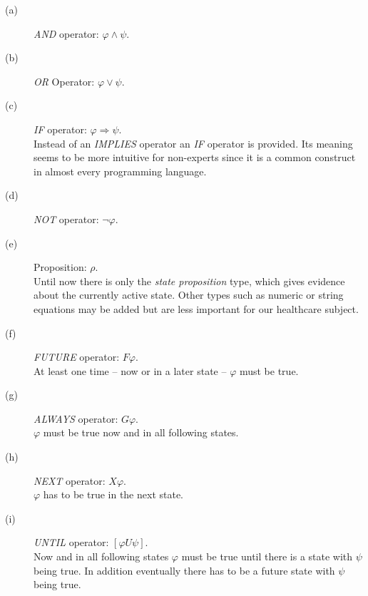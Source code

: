 \documentclass[conference]{IEEEtran}
\begin{document}
\begin{description}
	\item[(a)] \emph{AND} operator: $\varphi \wedge \psi$.
	\item[(b)] \emph{OR} Operator: $\varphi \vee \psi$.
	\item[(c)] \emph{IF} operator: $\varphi \Rightarrow \psi$.\\Instead of an \emph{IMPLIES} operator an \emph{IF} operator is provided. Its meaning seems to be more intuitive for non-experts since it is a common construct in almost every programming language.
	\item[(d)] \emph{NOT} operator: $\neg \varphi$.
	\item[(e)] Proposition: $\rho$.\\Until now there is only the \emph{state proposition} type, which gives evidence about the currently active state. Other types such as numeric or string equations may be added but are less important for our healthcare subject.
	\item[(f)] \emph{FUTURE} operator: $F \varphi$.\\At least one time -- now or in a later state -- $\varphi$ must be true.
	\item[(g)] \emph{ALWAYS} operator: $G \varphi$.\\$\varphi$ must be true now and in all following states.
	\item[(h)] \emph{NEXT} operator: $X \varphi$.\\$\varphi$ has to be true in the next state.
	\item[(i)] \emph{UNTIL} operator: $[\varphi U \psi]$.\\Now and in all following states $\varphi$ must be true until there is a state with $\psi$ being true. In addition eventually there has to be a future state with $\psi$ being true.
\end{description}
\end{document}
